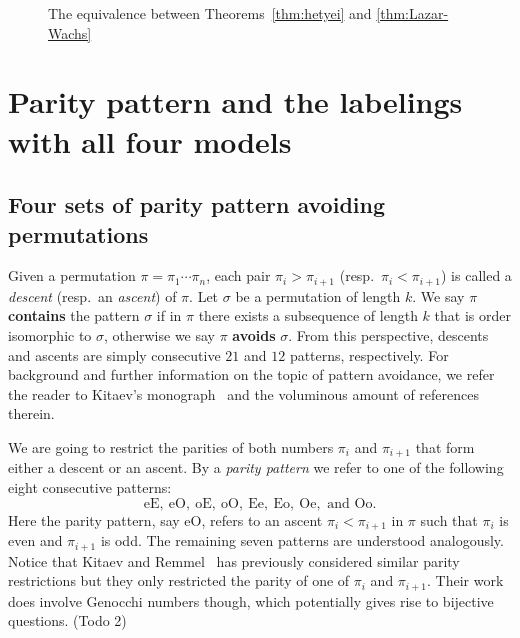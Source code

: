 \documentclass[11pt,reqno]{amsart}
\numberwithin{equation}{section}
\theoremstyle{plain}
\theoremstyle{definition}
\newcommand{\SF}[1]{\color{magenta}#1}
\newcommand{\cE}{\mathcal{E}}
\newcommand{\fG}{\mathfrak{G}}
\newcommand{\cH}{\mathcal{H}}
\newcommand{\cK}{\mathcal{K}}
\newcommand{\GI}{\fG^{\mathrm{I}}}
\newcommand{\LI}{\Lambda^{\mathrm{I}}}
\def\oO{\mathrm{oO}}
\def\oE{\mathrm{oE}}
\def\eE{\mathrm{eE}}
\def\eO{\mathrm{eO}}
\def\Oo{\mathrm{Oo}}
\def\Eo{\mathrm{Eo}}
\def\Ee{\mathrm{Ee}}
\def\Oe{\mathrm{Oe}}
\begin{document}
\begin{figure}
\caption{The equivalence between Theorems~\ref{thm:hetyei} and \ref{thm:Lazar-Wachs} \label{relation diagram}}
\end{figure}

\section{Parity pattern and the labelings with all four models}\label{sec:labeling}
\subsection{Four sets of parity pattern avoiding permutations}\label{sub:la.def}
Given a permutation $\pi=\pi_1\cdots\pi_n$, each pair $\pi_i>\pi_{i+1}$ (resp.~$\pi_i<\pi_{i+1}$) is called a {\it descent} (resp.~an {\it ascent}) of $\pi$. Let $\sigma$ be a permutation of length $k$. We say $\pi$ \textbf{contains} the pattern $\sigma$ if in $\pi$ there exists a subsequence of length $k$ that is order isomorphic to $\sigma$, otherwise we say $\pi$ \textbf{avoids} $\sigma$. From this perspective, descents and ascents are simply consecutive $21$ and $12$ patterns, respectively. For background and further information on the topic of pattern avoidance, we refer the reader to Kitaev's monograph~\cite{kit11} and the voluminous amount of references therein. 

We are going to restrict the parities of both numbers $\pi_i$ and $\pi_{i+1}$ that form either a descent or an ascent.  By a {\it parity pattern} we refer to one of the following eight consecutive patterns:
$$\eE,~\eO,~\oE,~\oO,~\Ee,~\Eo,~\Oe,\text{ and }\Oo.$$
Here the parity pattern, say $\eO$, refers to an ascent $\pi_i<\pi_{i+1}$ in $\pi$ such that $\pi_i$ is even and $\pi_{i+1}$ is odd. The remaining seven patterns are understood analogously. Notice that Kitaev and Remmel~\cite{KR07} has previously considered similar parity restrictions but they only restricted the parity of one of $\pi_i$ and $\pi_{i+1}$. Their work does involve Genocchi numbers though, which potentially gives rise to bijective questions. ({\SF Todo 2})
\end{document}
